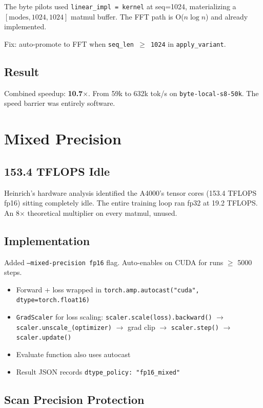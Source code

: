 \documentclass[11pt,a4paper]{report}
\begin{document}
The byte pilots used \texttt{linear\_impl = kernel} at seq=1024, materializing a $[\text{modes}, 1024, 1024]$ matmul buffer. The FFT path is O($n \log n$) and already implemented.

Fix: auto-promote to FFT when \texttt{seq\_len $\geq$ 1024} in \texttt{apply\_variant}.

\section{Result}

Combined speedup: \textbf{10.7$\times$}. From 59k to 632k tok/s on \texttt{byte-local-s8-50k}. The speed barrier was entirely software.


\chapter{Mixed Precision}

\section{153.4 TFLOPS Idle}

Heinrich's hardware analysis identified the A4000's tensor cores (153.4 TFLOPS fp16) sitting completely idle. The entire training loop ran fp32 at 19.2 TFLOPS. An 8$\times$ theoretical multiplier on every matmul, unused.

\section{Implementation}

Added \texttt{--mixed-precision fp16} flag. Auto-enables on CUDA for runs $\geq$ 5000 steps.

\begin{itemize}[nosep]
\item Forward + loss wrapped in \texttt{torch.amp.autocast("cuda", dtype=torch.float16)}
\item \texttt{GradScaler} for loss scaling: \texttt{scaler.scale(loss).backward()} $\to$ \texttt{scaler.unscale\_(optimizer)} $\to$ grad clip $\to$ \texttt{scaler.step()} $\to$ \texttt{scaler.update()}
\item Evaluate function also uses autocast
\item Result JSON records \texttt{dtype\_policy: "fp16\_mixed"}
\end{itemize}

\section{Scan Precision Protection}
\end{document}
